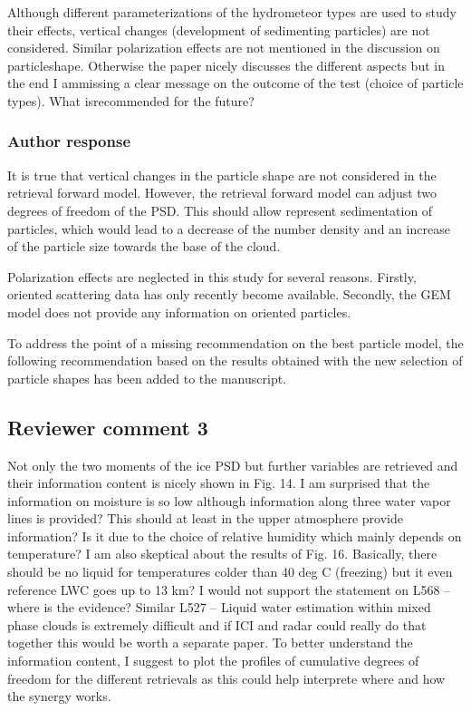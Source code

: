 \documentclass[11pt]{scrartcl}
\begin{document}
Although different parameterizations of the hydrometeor types are used to
study their effects, vertical changes (development of sedimenting particles)
are not considered. Similar polarization effects are not mentioned in the
discussion on particleshape. Otherwise the paper nicely discusses the different
aspects but in the end I ammissing a clear message on the outcome of the test
(choice of particle types). What isrecommended for the future?

\subsubsection*{Author response}

It is true that vertical changes in the particle shape are not considered in the
retrieval forward model. However, the retrieval forward model can adjust two
degrees of freedom of the PSD. This should allow represent sedimentation of particles,
which would lead to a decrease of the number density and an increase of the particle
size towards the base of the cloud.

Polarization effects are neglected in this study for several reasons. Firstly,
oriented scattering data has only recently become available. Secondly, the GEM
model does not provide any information on oriented particles.

To address the point of a missing recommendation on the best particle model, the
following recommendation based on the results obtained with the new selection of
particle shapes has been added to the manuscript.

\subsection*{Reviewer comment 3}

Not only the two moments of the ice PSD but further variables are retrieved and
their information content is nicely shown in Fig. 14. I am surprised that the
information on moisture is so low although information along three water vapor
lines is provided? This should at least in the upper atmosphere provide
information? Is it due to the choice of relative humidity which mainly depends
on temperature? I am also skeptical about the results of Fig. 16. Basically,
there should be no liquid for temperatures colder than 40 deg C (freezing) but
it even reference LWC goes up to 13 km? I would not support the statement on
L568 – where is the evidence? Similar L527 – Liquid water estimation within
mixed phase clouds is extremely difficult and if ICI and radar could really do
that together this would be worth a separate paper. To better understand the
information content, I suggest to plot the profiles of cumulative degrees of
freedom for the different retrievals as this could help interprete where and how
the synergy works.
\end{document}
